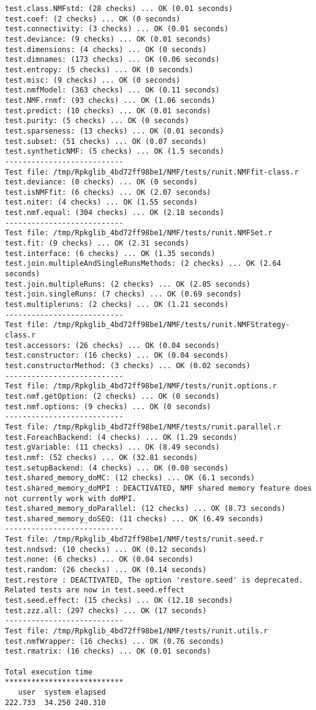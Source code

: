 \documentclass[10pt]{article}
\begin{document}
\begin{verbatim}
test.class.NMFstd: (28 checks) ... OK (0.01 seconds)
test.coef: (2 checks) ... OK (0 seconds)
test.connectivity: (3 checks) ... OK (0.01 seconds)
test.deviance: (9 checks) ... OK (0.01 seconds)
test.dimensions: (4 checks) ... OK (0 seconds)
test.dimnames: (173 checks) ... OK (0.06 seconds)
test.entropy: (5 checks) ... OK (0 seconds)
test.misc: (9 checks) ... OK (0 seconds)
test.nmfModel: (363 checks) ... OK (0.11 seconds)
test.NMF.rnmf: (93 checks) ... OK (1.06 seconds)
test.predict: (10 checks) ... OK (0.01 seconds)
test.purity: (5 checks) ... OK (0 seconds)
test.sparseness: (13 checks) ... OK (0.01 seconds)
test.subset: (51 checks) ... OK (0.07 seconds)
test.syntheticNMF: (5 checks) ... OK (1.5 seconds)
--------------------------- 
Test file: /tmp/Rpkglib_4bd72ff98be1/NMF/tests/runit.NMFfit-class.r 
test.deviance: (0 checks) ... OK (0 seconds)
test.isNMFfit: (6 checks) ... OK (2.07 seconds)
test.niter: (4 checks) ... OK (1.55 seconds)
test.nmf.equal: (304 checks) ... OK (2.18 seconds)
--------------------------- 
Test file: /tmp/Rpkglib_4bd72ff98be1/NMF/tests/runit.NMFSet.r 
test.fit: (9 checks) ... OK (2.31 seconds)
test.interface: (6 checks) ... OK (1.35 seconds)
test.join.multipleAndSingleRunsMethods: (2 checks) ... OK (2.64 seconds)
test.join.multipleRuns: (2 checks) ... OK (2.85 seconds)
test.join.singleRuns: (7 checks) ... OK (0.69 seconds)
test.multipleruns: (2 checks) ... OK (1.21 seconds)
--------------------------- 
Test file: /tmp/Rpkglib_4bd72ff98be1/NMF/tests/runit.NMFStrategy-class.r 
test.accessors: (26 checks) ... OK (0.04 seconds)
test.constructor: (16 checks) ... OK (0.04 seconds)
test.constructorMethod: (3 checks) ... OK (0.02 seconds)
--------------------------- 
Test file: /tmp/Rpkglib_4bd72ff98be1/NMF/tests/runit.options.r 
test.nmf.getOption: (2 checks) ... OK (0 seconds)
test.nmf.options: (9 checks) ... OK (0 seconds)
--------------------------- 
Test file: /tmp/Rpkglib_4bd72ff98be1/NMF/tests/runit.parallel.r 
test.ForeachBackend: (4 checks) ... OK (1.29 seconds)
test.gVariable: (11 checks) ... OK (8.49 seconds)
test.nmf: (52 checks) ... OK (32.81 seconds)
test.setupBackend: (4 checks) ... OK (0.08 seconds)
test.shared_memory_doMC: (12 checks) ... OK (6.1 seconds)
test.shared_memory_doMPI : DEACTIVATED, NMF shared memory feature does not currently work with doMPI.
test.shared_memory_doParallel: (12 checks) ... OK (8.73 seconds)
test.shared_memory_doSEQ: (11 checks) ... OK (6.49 seconds)
--------------------------- 
Test file: /tmp/Rpkglib_4bd72ff98be1/NMF/tests/runit.seed.r 
test.nndsvd: (10 checks) ... OK (0.12 seconds)
test.none: (6 checks) ... OK (0.04 seconds)
test.random: (26 checks) ... OK (0.14 seconds)
test.restore : DEACTIVATED, The option 'restore.seed' is deprecated. Related tests are now in test.seed.effect
test.seed.effect: (15 checks) ... OK (12.18 seconds)
test.zzz.all: (297 checks) ... OK (17 seconds)
--------------------------- 
Test file: /tmp/Rpkglib_4bd72ff98be1/NMF/tests/runit.utils.r 
test.nmfWrapper: (16 checks) ... OK (0.76 seconds)
test.rmatrix: (16 checks) ... OK (0.01 seconds)

Total execution time
***************************
   user  system elapsed 
222.733  34.250 240.310 

\end{verbatim}
\end{document}
